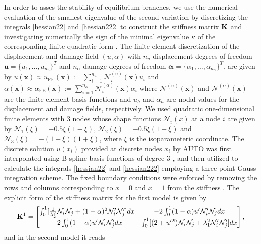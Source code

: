 In order to asses the stability of equilibrium branches, we use  the numerical evaluation of the smallest eigenvalue of the second variation by discretizing the integrals \eqref{hessian22} and   \eqref{hessian222} to construct the stiffness matrix
${\bf K}$ and investigating numerically the sign of the minimal eigenvalue $\kappa$ of the corresponding finite quadratic form \cite{Sanderson2016-ht}.  The finite element discretization of the displacement and damage field $(u, \alpha )$     with \( n_u \) displacement degrees-of-freedom 
$
\mathbf{u} = \{ u_1, \ldots, u_{n_u} \}^T 
$
and \( n_\alpha \) damage degrees-of-freedom 
$
\boldsymbol{\alpha} = \{ \alpha_1, \ldots, \alpha_{n_\alpha} \}^T.
$ are given by 
$
u(\mathbf{x}) \approx u_{\text{FE}} (\mathbf{x}) := \sum_{i=1}^{n_u} \mathcal{N}^{(u)}_i(\mathbf{x}) u_i $
and $\alpha(\mathbf{x}) \approx \alpha_{\text{FE}} (\mathbf{x}) := \sum_{i=1}^{n_\alpha} \mathcal{N}^{(\alpha)}_i (\mathbf{x}) \alpha_i 
$
where $\mathcal{N}^{(u)}(\mathbf{x}) $ and $\mathcal{N}^{(\alpha)}(\mathbf{x}) $ are the finite element basis functions and  $u_h$ and  $\alpha_h$ are nodal values for the displacement and damage fields, respectively. We used quadratic one-dimensional finite elements with 3 nodes  whose   shape functions   ${\mathcal N}_i(x)$ at a node $i$  are given by ${\mathcal N}_1(\xi)=-0.5\xi(1-\xi)$, ${\mathcal N}_2(\xi)=-0.5\xi(1+\xi)$ and ${\mathcal N}_3(\xi)=-(1-\xi)(1+\xi)$, where $\xi$ is the isoparameteric coordinate. The discrete solution $u(x_i)$ provided at discrete nodes $x_i$ by AUTO was first interpolated using B-spline basis functions of degree 3 \cite{Grimstad2016-cq}, and then utilized to calculate the integrals \eqref{hessian22} and   \ref{hessian222} employing a three-point Gauss integration scheme. The fixed boundary conditions were enforced by removing the rows and columns corresponding to $x = 0$ and $x = 1$ from the stiffness   . The explicit form of the stiffness matrix for the first model is given by
\begin{equation}
{\bf K}^1=\begin{bmatrix}
\int_0^1[ \frac{1}{\lambda_2^2}{\mathcal N}_i{\mathcal N}_j + (1-\alpha)^2{\mathcal N}'_i{\mathcal N}'_j
] dx&
-2\int_0^1(1-\alpha)u' {\mathcal N}'_i {\mathcal N}_j  dx\\
-2\int_0^1(1-\alpha)u' {\mathcal N}_i {\mathcal N}'_j dx
& \int_0^1 [ (2+u'^2){\mathcal N}_i{\mathcal N}_j +\lambda_1^2{\mathcal N}'_i{\mathcal N}'_j] dx
\end{bmatrix},
\label{eq:stifness1}
\end{equation}
and in the second model it reads

